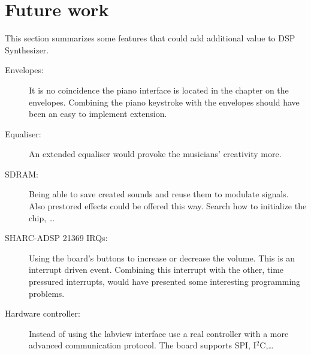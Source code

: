 \section{Future work}\label{sec:future}
This section summarizes some features that could add additional value to DSP Synthesizer.
\begin{description}
\item[Envelopes:] It is no coincidence the piano interface is located in the chapter on the envelopes. Combining the piano keystroke with the envelopes should have been an easy to implement extension.
\item[Equaliser:] An extended equaliser would provoke the musicians' creativity more.
\item[SDRAM:] Being able to save created sounds and reuse them to modulate signals. Also prestored effects could be offered this way. Search how to initialize the chip, \dots
\item[SHARC-ADSP 21369 IRQs:] Using the board's buttons to increase or decrease the volume. This is an interrupt driven event. Combining this interrupt with the other, time pressured interrupts, would have presented some interesting programming problems.
\item[Hardware controller:] Instead of using the labview interface use a real controller with a more advanced communication protocol. The board supports SPI, I$^{2}$C,\dots
\end{description}
